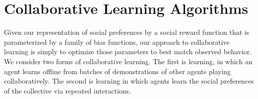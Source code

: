 
\section{Collaborative Learning Algorithms}
\label{sec:learning}

Given our representation of social preferences by a social reward
function that is parameterized by a family of bias functions, our
approach to collaborative learning is simply to optimize those
parameters to best match observed behavior.  We consider two forms of
collaborative learning.  The first is  learning, in which
an agent learns offline from batches of demonstrations of other agents
playing collaboratively.  The second is  learning
in which agents learn the social preferences of the collective via
repeated interactions.



